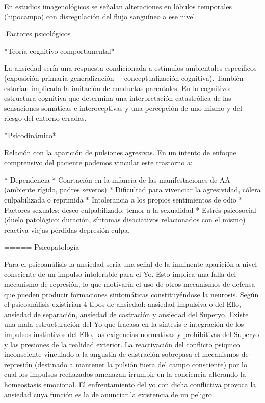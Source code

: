\documentclass{scrbook}
\begin{document}
En estudios imagenológicos se señalan alteraciones en lóbulos temporales (hipocampo) con disregulación del flujo sanguíneo a ese nivel.

.Factores psicológicos

*Teoría cognitivo-comportamental*

La ansiedad sería una respuesta condicionada a estímulos ambientales específicos (exposición primaria generalización + conceptualización cognitiva). También estarían implicada la imitación de conductas parentales.
En lo cognitivo: estructura cognitiva que determina una interpretación catastrófica de las sensaciones somáticas e interoceptivas y una percepción de uno mismo y del riesgo del entorno erradas.

*Psicodinámico*

Relación con la aparición de pulsiones agresivas. En un intento de enfoque comprensivo del paciente podemos vincular este trastorno a:

* Dependencia
* Coartación en la infancia de las manifestaciones de AA (ambiente rígido, padres severos)
* Dificultad para vivenciar la agresividad, cólera culpabilizada o reprimida
* Intolerancia a los propios sentimientos de odio
* Factores sexuales: deseo culpabilizado, temor a la sexualidad
* Estrés psicosocial (duelo patológico: duración, síntomas disociativos relacionados con el mismo) reactiva viejas pérdidas depresión culpa.

===== Psicopatología

Para el psicoanálisis la ansiedad sería una señal de la inminente aparición a nivel consciente de un impulso intolerable para el Yo. Esto implica una falla del mecanismo de represión, lo que motivaría el uso de otros mecanismos de defensa que pueden producir formaciones sintomáticas constituyéndose la neurosis. Según el psicoanálisis existirían 4 tipos de ansiedad: ansiedad impulsiva o del Ello, ansiedad de separación, ansiedad de castración y ansiedad del Superyo. Existe una mala estructuración del Yo que fracasa en la síntesis e integración de los impulsos instintivos del Ello, las exigencias normativas y prohibitivas del Superyo y las presiones de la realidad exterior. La reactivación del conflicto psíquico inconsciente vinculado a la angustia de castración sobrepasa el mecanismos de represión (destinado a mantener la pulsión fuera del campo consciente) por lo cual los impulsos rechazados amenazan irrumpir en la conciencia alterando la homeostasis emocional. El enfrentamiento del yo con dicha conflictiva provoca la ansiedad cuya función es la de anunciar la existencia de un peligro. 
\end{document}
